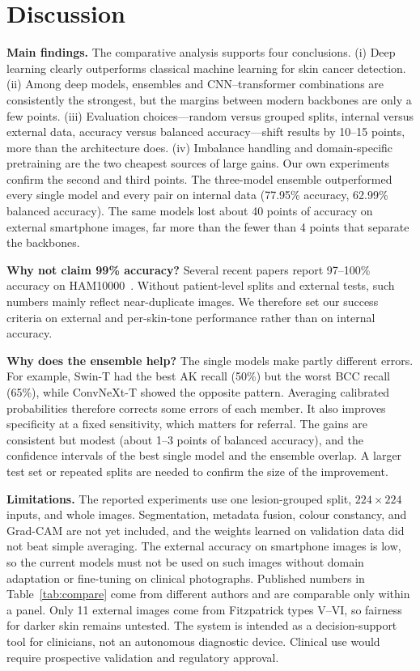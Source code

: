 \section{Discussion}\label{sec:discuss}
\textbf{Main findings.} The comparative analysis supports four
conclusions. (i) Deep learning clearly outperforms classical machine
learning for skin cancer detection. (ii) Among deep models, ensembles
and CNN--transformer combinations are consistently the strongest, but
the margins between modern backbones are only a few points. (iii)
Evaluation choices---random versus grouped splits, internal versus
external data, accuracy versus balanced accuracy---shift results by
10--15 points, more than the architecture does. (iv) Imbalance handling
and domain-specific pretraining are the two cheapest sources of large
gains. Our own experiments confirm the second and third points. The
three-model ensemble outperformed every single model and every pair on
internal data (77.95\% accuracy, 62.99\% balanced accuracy). The same
models lost about 40 points of accuracy on external smartphone images,
far more than the fewer than 4 points that separate the backbones.

\textbf{Why not claim 99\% accuracy?} Several recent papers report
97--100\% accuracy on HAM10000~\cite{naeem2025,behara2023}. Without
patient-level splits and external tests, such numbers mainly reflect
near-duplicate images. We therefore set our success criteria on
external and per-skin-tone performance rather than on internal
accuracy.

\textbf{Why does the ensemble help?} The single models make partly
different errors. For example, Swin-T had the best AK recall (50\%) but
the worst BCC recall (65\%), while ConvNeXt-T showed the opposite
pattern. Averaging calibrated probabilities therefore corrects some
errors of each member. It also improves specificity at a fixed
sensitivity, which matters for referral. The gains are consistent but
modest (about 1--3 points of balanced accuracy), and the confidence
intervals of the best single model and the ensemble overlap. A larger
test set or repeated splits are needed to confirm the size of the
improvement.

\textbf{Limitations.} The reported experiments use one lesion-grouped
split, $224\times224$ inputs, and whole images. Segmentation, metadata
fusion, colour constancy, and Grad-CAM are not yet included, and the
weights learned on validation data did not beat simple averaging. The
external accuracy on smartphone images is low, so the current models
must not be used on such images without domain adaptation or
fine-tuning on clinical photographs. Published numbers in
Table~\ref{tab:compare} come from different authors and are comparable
only within a panel. Only 11 external images come from Fitzpatrick types
V--VI, so fairness for darker skin remains untested. The system is intended as a
decision-support tool for clinicians, not an autonomous diagnostic
device. Clinical use would require prospective validation and
regulatory approval.

